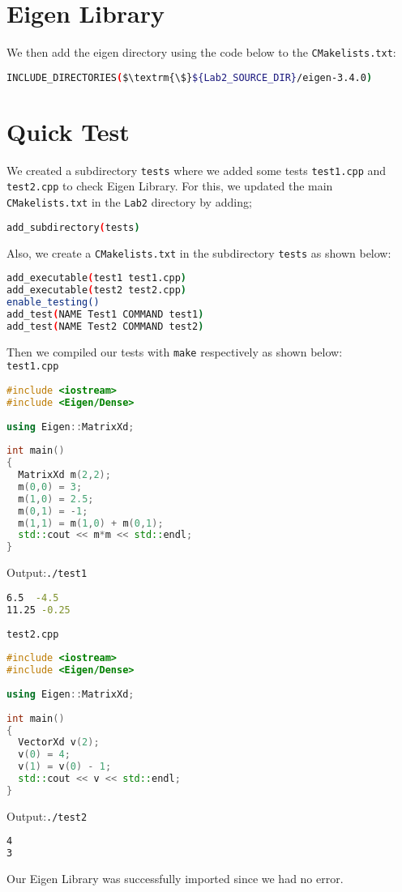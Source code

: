\documentclass[11pt]{article}
\begin{document}
\section{Eigen Library}
We then add the eigen directory using the code below to the \texttt{CMakelists.txt}:

\begin{lstlisting}[language={sh}]
INCLUDE_DIRECTORIES($\textrm{\$}${Lab2_SOURCE_DIR}/eigen-3.4.0)
\end{lstlisting}

\section{Quick Test}
We created a subdirectory \texttt{tests} where we added some tests \texttt{test1.cpp} and \texttt{test2.cpp}  to check Eigen Library. For this, we updated the main \texttt{CMakelists.txt} in the \texttt{Lab2} directory by adding;
\begin{lstlisting}[language={sh}]
add_subdirectory(tests)
\end{lstlisting}
\vspace{5mm}
Also, we create a \texttt{CMakelists.txt} in the subdirectory \texttt{tests}  as shown below:
\begin{lstlisting}[language={sh}]
add_executable(test1 test1.cpp)
add_executable(test2 test2.cpp)
enable_testing()
add_test(NAME Test1 COMMAND test1)
add_test(NAME Test2 COMMAND test2)
\end{lstlisting}
Then we compiled our tests with \texttt{make} respectively as shown below:\\
\texttt{test1.cpp} 
\begin{lstlisting}[language=c++]
#include <iostream>
#include <Eigen/Dense>
 
using Eigen::MatrixXd;
 
int main()
{
  MatrixXd m(2,2);
  m(0,0) = 3;
  m(1,0) = 2.5;
  m(0,1) = -1;
  m(1,1) = m(1,0) + m(0,1);
  std::cout << m*m << std::endl;
}
\end{lstlisting}
Output:\texttt{./test1}
\begin{lstlisting}[language={sh}]
 6.5  -4.5
11.25 -0.25
\end{lstlisting}
\texttt{test2.cpp} 
\begin{lstlisting}[language=c++]
#include <iostream>
#include <Eigen/Dense>
 
using Eigen::MatrixXd;
 
int main()
{
  VectorXd v(2);
  v(0) = 4;
  v(1) = v(0) - 1;
  std::cout << v << std::endl;
}
\end{lstlisting}
Output:\texttt{./test2}
\begin{lstlisting}[language={sh}]
4
3
\end{lstlisting}
Our Eigen Library was successfully imported since we had no error.\\
\end{document}
